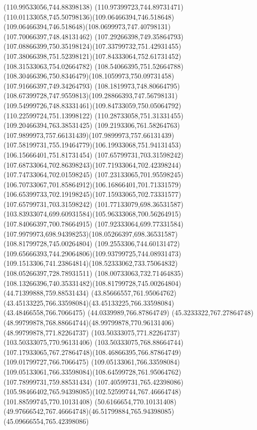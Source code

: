{{\lineto(110.99533056,744.88398138)
\curveto(110.97399723,744.89731471)(110.01133058,745.50798136)(109.06466394,746.518648)
\curveto(109.06466394,746.518648)(108.0699973,747.40798131)(107.70066397,748.48131462)
\curveto(107.29266398,749.35864793)(107.08866399,750.35198124)(107.33799732,751.42931455)
\curveto(107.38066398,751.52398121)(107.84333064,752.61731452)(108.31533063,754.02664782)
\lineto(108.54066395,751.52664788)
\curveto(108.30466396,750.8346479)(108.1059973,750.09731458)(107.91666397,749.34264793)
\curveto(108.1819973,748.80664795)(108.67399728,747.9559813)(109.28866393,747.56798131)
\curveto(109.54999726,748.83331461)(109.84733059,750.05064792)(110.22599724,751.13998122)
\lineto(110.28733058,751.31331455)
\lineto(109.20466394,763.38531425)
\curveto(109.2193306,761.58264763)(107.9899973,757.66131439)(107.9899973,757.66131439)
\curveto(107.58199731,755.19464779)(106.19933068,751.94131453)(106.15666401,751.81731454)
\moveto(107.65799731,703.31598242)
\curveto(107.68733064,702.86398243)(107.71933064,702.42398244)(107.74733064,702.01598245)
\curveto(107.23133065,701.95598245)(106.70733067,701.85864912)(106.16866401,701.71331579)
\curveto(106.65399733,702.19198245)(107.15933065,702.73331577)(107.65799731,703.31598242)
\moveto(101.77133079,698.36531587)
\curveto(103.83933074,699.60931584)(105.96333068,700.56264915)(107.84066397,700.78664915)
\curveto(107.92333064,699.77331584)(107.9979973,698.94398253)(108.05266397,698.36531587)
\closepath
\moveto(108.81799728,745.00264804)
\curveto(109.2553306,744.60131472)(109.65666393,744.29064806)(109.93799725,744.08931473)
\curveto(109.1513306,741.23864814)(108.52333062,733.75064832)(108.05266397,728.78931511)
\curveto(108.00733063,732.71464835)(108.13266396,740.35331482)(108.81799728,745.00264804)
\moveto(44.71399888,759.88531434)
\curveto(43.85666557,761.95064762)(43.45133225,766.33598084)(43.45133225,766.33598084)
\lineto(43.48466558,766.7066475)
\lineto(44.0339989,766.87864749)
\curveto(45.3233322,767.27864748)(48.99799878,768.88664744)(48.99799878,770.96131406)
\lineto(48.99799878,771.82264737)
\lineto(103.50333075,771.82264737)
\lineto(103.50333075,770.96131406)
\curveto(103.50333075,768.88664744)(107.17933065,767.27864748)(108.46866395,766.87864749)
\lineto(109.01799727,766.7066475)
\lineto(109.05133061,766.33598084)
\curveto(109.05133061,766.33598084)(108.64599728,761.95064762)(107.78999731,759.88531434)
\lineto(107.40599731,765.42398086)
\curveto(105.98466402,765.94398085)(102.52599744,767.46664748)(101.88599745,770.10131408)
\lineto(50.6166654,770.10131408)
\curveto(49.97666542,767.46664748)(46.51799884,765.94398085)(45.09666554,765.42398086)
}}
